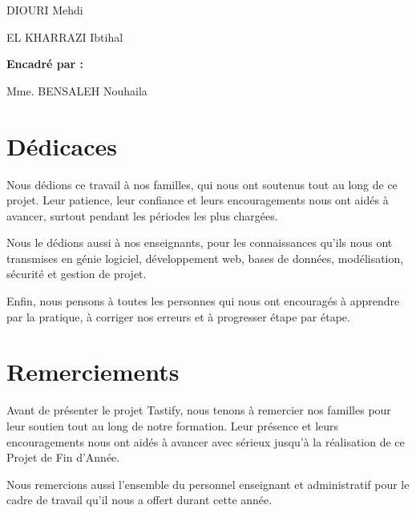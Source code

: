 \begin{titlepage}
\begin{flushleft}
\hspace{1.45cm}DIOURI Mehdi

\hspace{1.45cm}EL KHARRAZI Ibtihal
\end{flushleft}

\vspace{0.65cm}

\begin{flushleft}
\hspace{1.45cm}\textbf{Encadré par :}

\vspace{0.15cm}

\hspace{1.45cm}Mme. BENSALEH Nouhaila
\end{flushleft}

\end{titlepage}



\clearpage
{}

\chapter*{Dédicaces}
Nous dédions ce travail à nos familles, qui nous ont soutenus tout au long de ce projet. Leur patience, leur confiance et leurs encouragements nous ont aidés à avancer, surtout pendant les périodes les plus chargées.

Nous le dédions aussi à nos enseignants, pour les connaissances qu’ils nous ont transmises en génie logiciel, développement web, bases de données, modélisation, sécurité et gestion de projet.

Enfin, nous pensons à toutes les personnes qui nous ont encouragés à apprendre par la pratique, à corriger nos erreurs et à progresser étape par étape.

\chapter*{Remerciements}
Avant de présenter le projet Tastify, nous tenons à remercier nos familles pour leur soutien tout au long de notre formation. Leur présence et leurs encouragements nous ont aidés à avancer avec sérieux jusqu’à la réalisation de ce Projet de Fin d’Année.

Nous remercions aussi l’ensemble du personnel enseignant et administratif pour le cadre de travail qu’il nous a offert durant cette année.

